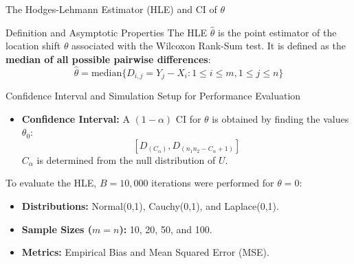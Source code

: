 \documentclass[8pt]{beamer}
\begin{document}
\begin{frame}{The Hodges-Lehmann Estimator (HLE) and CI of $\theta$}
    \footnotesize
    \begin{block}{Definition and Asymptotic Properties}
        The HLE $\hat{\theta}$ is the point estimator of the location shift $\theta$ associated with the Wilcoxon Rank-Sum test. It is defined as the \textbf{median of all possible pairwise differences}:
        $$\hat{\theta} = \text{median} \{D_{i,j} = Y_j - X_i : 1 \le i \le m, 1 \le j \le n\}$$
    \end{block}

    \begin{block}{Confidence Interval and Simulation Setup for Performance Evaluation}
        \begin{itemize}
            \item \textbf{Confidence Interval:} A $(1-\alpha)$ CI for $\theta$ is obtained by finding the values $\theta_0$: \[ [D_{(C_\alpha)}, D_{(n_1n_2-C_{\alpha}+1)}]\] $C_{\alpha}$ is determined from the null distribution of $U$.
        \end{itemize}
        To evaluate the HLE, $B = 10,000$ iterations were performed for $\theta = 0$:
        \begin{itemize}
            \item \textbf{Distributions:} Normal(0,1), Cauchy(0,1), and Laplace(0,1).
            \item \textbf{Sample Sizes ($m=n$):} 10, 20, 50, and 100.
            \item \textbf{Metrics:} Empirical Bias and Mean Squared Error (MSE).
        \end{itemize}
    \end{block}

\end{frame}
\end{document}
